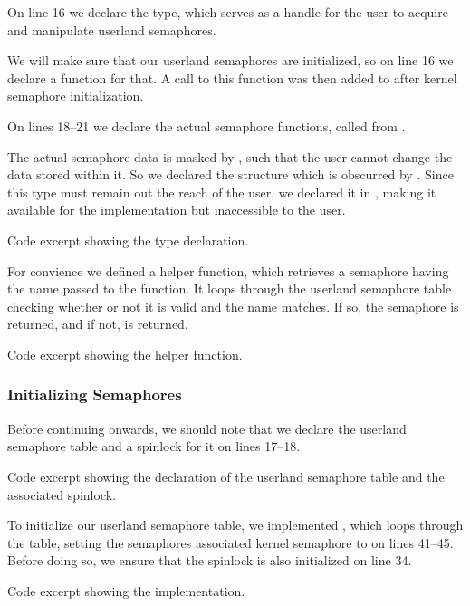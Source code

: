 On line 16 we declare the  type, which serves as a handle
for the user to acquire and manipulate userland semaphores.

We will make sure that our userland semaphores are initialized, so on line
16 we declare a function for that. A call to this function was then added to
 after kernel semaphore initialization.

On lines 18--21 we declare the actual semaphore functions, called from
.

The actual semaphore data is masked by , such that the user
cannot change the data stored within it. So we declared the structure
 which is obscurred by . Since this type must
remain out the reach of the user, we declared it in ,
making it available for the implementation but inaccessible to the user.

{Code excerpt showing the  type declaration.}

For convience we defined a helper function, which retrieves a semaphore having
the name passed to the function. It loops through the userland semaphore table
checking whether or not it is valid and the name matches. If so, the semaphore
is returned, and if not,  is returned.

{Code excerpt showing the  helper function.}

\subsubsection{Initializing Semaphores}
Before continuing onwards, we should note that we declare the userland semaphore
table and a spinlock for it on lines 17--18.

{Code excerpt showing the declaration of the userland semaphore table and the
associated spinlock.}

To initialize our userland semaphore table, we implemented
, which loops through the table, setting the
semaphores associated kernel semaphore to  on lines 41--45. Before
doing so, we ensure that the spinlock is also initialized on line 34.

{Code excerpt showing the  implementation.}

